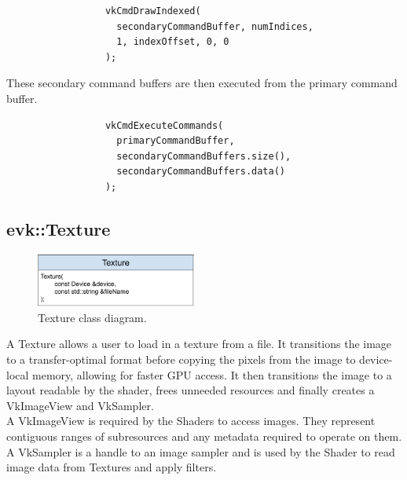 \documentclass[12pt]{report}
\newcommand{\figurewidth}{0.55\textwidth}
\newcommand{\imagewidth}{0.47\textwidth}
\theoremstyle{definition}
\begin{document}
        \begin{figure}[H]
        \begin{verbatim}
            vkCmdDrawIndexed(
              secondaryCommandBuffer, numIndices,
              1, indexOffset, 0, 0
            );
        \end{verbatim}
        \end{figure}

        These secondary command buffers are then executed from the primary
        command buffer.

        \begin{figure}[H]
        \begin{verbatim}
            vkCmdExecuteCommands(
              primaryCommandBuffer,
              secondaryCommandBuffers.size(),
              secondaryCommandBuffers.data()
            );
        \end{verbatim}
        \end{figure}

      \subsection{evk::Texture}

        \begin{figure}
          \centering
          \includegraphics[width=\imagewidth]{images/class_texture.png}
          \caption{Texture class diagram.}
          \label{fig:class_texture}  
        \end{figure}

        A Texture allows a user to load in a texture from a file. It transitions
        the image to a transfer-optimal format before copying the pixels from
        the image to device-local memory, allowing for faster GPU access. It
        then transitions the image to a layout readable by the shader, frees
        unneeded resources and finally creates a VkImageView and VkSampler. \\

        A VkImageView is required by the Shaders to access images. They
        represent contiguous ranges of subresources and any metadata
        required to operate on them. A VkSampler is a handle to an image
        sampler and is used by the Shader to read image data from Textures
        and apply filters.
\end{document}
